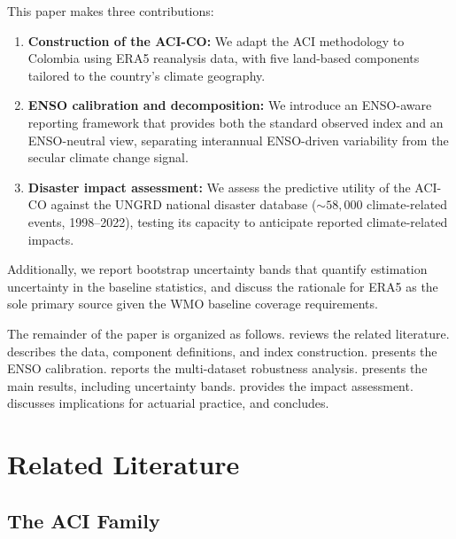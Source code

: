 \documentclass[12pt]{article}
\begin{document}
This paper makes three contributions:
 
\begin{enumerate}
\item \textbf{Construction of the ACI-CO:} We adapt the ACI methodology to Colombia using ERA5 reanalysis data, with five land-based components tailored to the country's climate geography.
 
\item \textbf{ENSO calibration and decomposition:} We introduce an ENSO-aware reporting framework that provides both the standard observed index and an ENSO-neutral view, separating interannual ENSO-driven variability from the secular climate change signal.
 
\item \textbf{Disaster impact assessment:} We assess the predictive utility of the ACI-CO against the UNGRD national disaster database (${\sim}58{,}000$ climate-related events, 1998--2022), testing its capacity to anticipate reported climate-related impacts.
\end{enumerate}
 
Additionally, we report bootstrap uncertainty bands that quantify estimation uncertainty in the baseline statistics, and discuss the rationale for ERA5 as the sole primary source given the WMO baseline coverage requirements.
 
The remainder of the paper is organized as follows.  reviews the related literature.  describes the data, component definitions, and index construction.  presents the ENSO calibration.  reports the multi-dataset robustness analysis.  presents the main results, including uncertainty bands.  provides the impact assessment.  discusses implications for actuarial practice, and  concludes.
 
\section{Related Literature}\label{sec:literature}
 
\subsection{The ACI Family}
 
\end{document}
